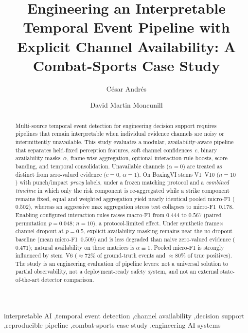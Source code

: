 \documentclass[preprint,12pt,numbers,sort&compress]{elsarticle}
\begin{document}
\begin{frontmatter}

\title{Engineering an Interpretable Temporal Event Pipeline with Explicit Channel Availability: A Combat-Sports Case Study}

\author[label=ucjc]{C\'esar Andr\'es}
\author[label=ucjc]{David Martin Moncunill}
\address[ucjc]{CRIA-BDHS Research Group, Higher Polytechnic School of Technology and Science,\\
Universidad Camilo Jos\'e Cela, Madrid, Spain}

\begin{abstract}
Multi-source temporal event detection for engineering decision support requires pipelines that remain interpretable when individual evidence channels are noisy or intermittently unavailable.
This study evaluates a modular, availability-aware pipeline that separates held-fixed perception features, soft channel confidences~$c$, binary availability masks~$\alpha$, frame-wise aggregation, optional interaction-rule boosts, score banding, and temporal consolidation.
Unavailable channels ($\alpha{=}0$) are treated as distinct from zero-valued evidence ($c{=}0$, $\alpha{=}1$).
On BoxingVI stems V1--V10 ($n{=}10$) with punch/impact \emph{proxy} labels, under a frozen matching protocol and a \emph{combined timeline} in which only the risk component is re-aggregated while a strike component remains fixed, equal and weighted aggregation yield nearly identical pooled micro-F1 ($0.502$), whereas an aggressive max aggregation stress test collapses to micro-F1~$0.178$.
Enabling configured interaction rules raises macro-F1 from $0.444$ to $0.567$ (paired permutation $p{=}0.048$; $n{=}10$), a protocol-limited effect.
Under synthetic frame$\times$channel dropout at $p{=}0.5$, explicit availability masking remains near the no-dropout baseline (mean micro-F1~$0.509$) and is less degraded than naive zero-valued evidence ($0.471$); natural availability on these matrices is $\alpha{\equiv}1$.
Pooled micro-F1 is strongly influenced by stem~V6 ($\approx$72\% of ground-truth events and $\approx$80\% of true positives).
The study is an engineering evaluation of pipeline levers: not a universal solution to partial observability, not a deployment-ready safety system, and not an external state-of-the-art detector comparison.
\end{abstract}

\begin{keyword}
interpretable AI \sep temporal event detection \sep channel availability \sep decision support \sep reproducible pipeline \sep combat-sports case study \sep engineering AI systems
\end{keyword}

\end{frontmatter}
\end{document}
